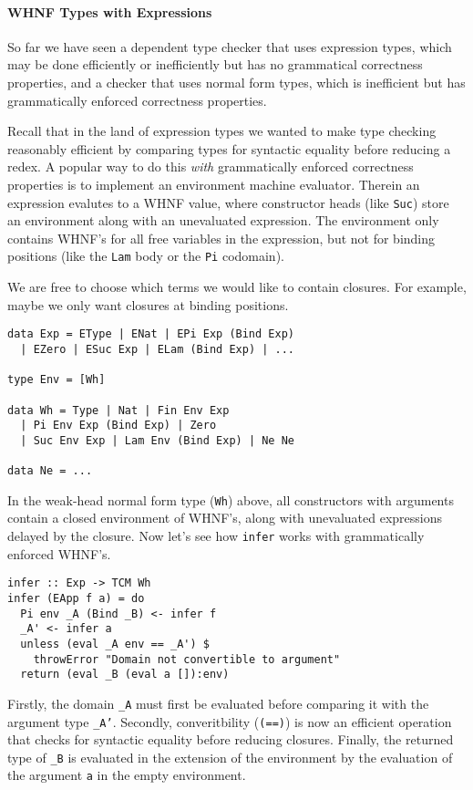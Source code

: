 \documentclass[preprint,authoryear]{sigplanconf}
\begin{document}
\paragraph{WHNF Types with Expressions}

So far we have seen a dependent type checker that uses
expression types, which may be done efficiently or inefficiently but
has no grammatical correctness properties, and a checker that uses
normal form types, which is inefficient but has grammatically enforced
correctness properties.

Recall that in the land of expression types we wanted to
make type checking reasonably efficient by
comparing types for syntactic equality before reducing a redex.
A popular way to do this {\it with} grammatically enforced correctness
properties is to implement an environment machine evaluator. Therein
an expression evalutes to a WHNF value, where constructor heads
(like \texttt{Suc}) store an environment along with an unevaluated
expression. The environment only contains WHNF's for all free
variables in the expression, but not for binding positions (like the
\texttt{Lam} body or the \texttt{Pi} codomain).

We are free to choose which terms we would like to contain closures.
For example, maybe we only want closures at binding positions. 

\begin{verbatim}
data Exp = EType | ENat | EPi Exp (Bind Exp)
  | EZero | ESuc Exp | ELam (Bind Exp) | ...

type Env = [Wh]

data Wh = Type | Nat | Fin Env Exp
  | Pi Env Exp (Bind Exp) | Zero
  | Suc Env Exp | Lam Env (Bind Exp) | Ne Ne

data Ne = ...
\end{verbatim}

In the weak-head normal form type (\texttt{Wh}) above, all
constructors with arguments contain a closed environment of WHNF's,
along with unevaluated expressions delayed by the closure. 
Now let's see how \texttt{infer} works with grammatically enforced
WHNF's.

\begin{verbatim}
infer :: Exp -> TCM Wh
infer (EApp f a) = do
  Pi env _A (Bind _B) <- infer f
  _A' <- infer a
  unless (eval _A env == _A') $
    throwError "Domain not convertible to argument"
  return (eval _B (eval a []):env)
\end{verbatim}

Firstly, the domain \texttt{\_A} must first be evaluated before comparing it
with the argument type \texttt{\_A'}. Secondly, converitbility
(\texttt{(==)}) is now an efficient operation that checks for
syntactic equality before reducing closures. Finally, the returned
type of \texttt{\_B} is evaluated in the extension of the environment
by the evaluation of the argument \texttt{a} in the empty environment.
\end{document}
